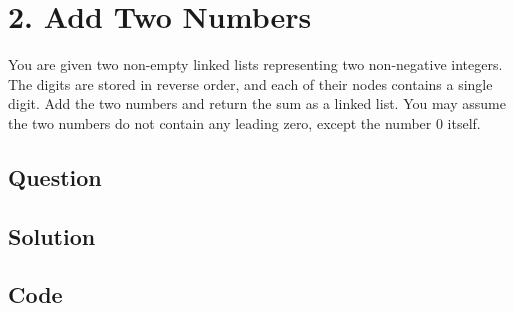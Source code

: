\newpage
\section*{2. Add Two Numbers}
You are given two non-empty linked lists representing two non-negative integers. The digits are stored in reverse order, and each of their nodes contains a single digit. Add the two numbers and return the sum as a linked list. You may assume the two numbers do not contain any leading zero, except the number 0 itself.


\subsection*{Question}
\subsection*{Solution}
\subsection*{Code}


